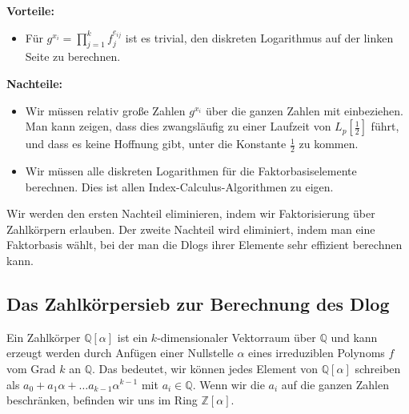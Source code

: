 \begin{refsegment}
\noindent \textbf{Vorteile:}
\begin{itemize}
\item Für $g^{x_i} = \prod_{j=1}^k f_j^{e_{ij}}$ ist es trivial, den diskreten Logarithmus auf der linken Seite zu berechnen.
\end{itemize}

\noindent \textbf{Nachteile:}
\begin{itemize}
\item Wir müssen relativ große Zahlen $g^{x_i}$ über die ganzen Zahlen mit einbeziehen. Man kann zeigen, dass dies zwangsläufig zu einer Laufzeit von $L_p[\frac 1 2]$ führt, und dass es keine Hoffnung gibt, unter die Konstante $\frac 1 2$ zu kommen.
\DIFdelbegin %

\DIFdelend \item Wir müssen alle diskreten Logarithmen für die Faktorbasiselemente berechnen. Dies ist allen Index-Calculus-Algorithmen zu eigen.
\end{itemize}

Wir werden den ersten Nachteil eliminieren, indem wir Faktorisierung über Zahlkörpern erlauben.
Der zweite Nachteil wird eliminiert, indem man eine Faktorbasis wählt, bei der man die Dlogs ihrer Elemente sehr effizient berechnen kann.



\subsection[Das Zahlkörpersieb zur Berechnung des Dlog]{Das Zahlkörpersieb zur Berechnung des Dlog\footnotemark}
\label{nfs-dlog}

Ein Zahlkörper $\mathbb{Q}[\alpha]$ ist ein $k$-dimensionaler Vektorraum über $\mathbb{Q}$ und kann erzeugt werden durch Anfügen einer Nullstelle $\alpha$ eines irreduziblen Polynoms $f$ vom Grad $k$ an $\mathbb{Q}$. Das bedeutet, wir können jedes Element von $\mathbb{Q}[\alpha]$ schreiben als $a_0+a_1\alpha + \ldots a_{k-1}\alpha^{k-1}$ mit $a_i \in \mathbb{Q}$. Wenn wir die $a_i$ auf die ganzen Zahlen beschränken, befinden wir uns im Ring $\mathbb{Z}[\alpha]$.


\end{refsegment}
